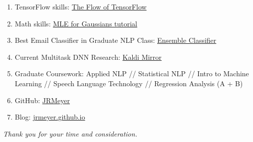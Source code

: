 \documentclass[12pt,a4paper]{article}
\begin{document}
\begin{enumerate}

\item TensorFlow skills: \href{http://jrmeyer.github.io/machinelearning/2016/02/01/TensorFlow-Tutorial.html}{The Flow of TensorFlow}
  
\item Math skills: \href{http://jrmeyer.github.io/machinelearning/2017/08/18/mle.html}{MLE for Gaussians tutorial}

\item Best Email Classifier in Graduate NLP Class: \href{https://github.com/JRMeyer/statistical_nlp/blob/master/spam_classifier.py}{Ensemble Classifier}

\item Current Multitask DNN Research: \href{https://github.com/JRMeyer/kaldi-mirror/tree/master/egs/kgz/kyrgyz-model}{Kaldi Mirror}

\item Graduate Coursework: Applied NLP // Statistical NLP // Intro to Machine Learning // Speech Language Technology // Regression Analysis (A + B)

\item GitHub: \href{https://github.com/JRMeyer}{JRMeyer}

\item Blog: \href{http://jrmeyer.github.io}{jrmeyer.github.io}
\end{enumerate}

    
\begin{center}
\textit{Thank you for your time and consideration.}  
\end{center}
\end{document}
